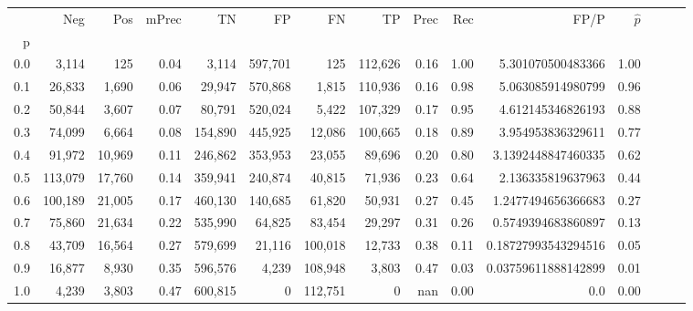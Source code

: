 \begin{tabular}{rrrrrrrrrrrrrrr}
\toprule
{} &      Neg &     Pos & mPrec &       TN &       FP &       FN &       TP &  Prec &   Rec &                 FP/P & $\hat{p}$ \\
p   &          &         &       &          &          &          &          &       &       &                      &           \\
\midrule
0.0 &    3,114 &     125 &  0.04 &    3,114 &  597,701 &      125 &  112,626 &  0.16 &  1.00 &    5.301070500483366 &      1.00 \\
0.1 &   26,833 &   1,690 &  0.06 &   29,947 &  570,868 &    1,815 &  110,936 &  0.16 &  0.98 &    5.063085914980799 &      0.96 \\
0.2 &   50,844 &   3,607 &  0.07 &   80,791 &  520,024 &    5,422 &  107,329 &  0.17 &  0.95 &    4.612145346826193 &      0.88 \\
0.3 &   74,099 &   6,664 &  0.08 &  154,890 &  445,925 &   12,086 &  100,665 &  0.18 &  0.89 &    3.954953836329611 &      0.77 \\
0.4 &   91,972 &  10,969 &  0.11 &  246,862 &  353,953 &   23,055 &   89,696 &  0.20 &  0.80 &   3.1392448847460335 &      0.62 \\
0.5 &  113,079 &  17,760 &  0.14 &  359,941 &  240,874 &   40,815 &   71,936 &  0.23 &  0.64 &    2.136335819637963 &      0.44 \\
0.6 &  100,189 &  21,005 &  0.17 &  460,130 &  140,685 &   61,820 &   50,931 &  0.27 &  0.45 &   1.2477494656366683 &      0.27 \\
0.7 &   75,860 &  21,634 &  0.22 &  535,990 &   64,825 &   83,454 &   29,297 &  0.31 &  0.26 &   0.5749394683860897 &      0.13 \\
0.8 &   43,709 &  16,564 &  0.27 &  579,699 &   21,116 &  100,018 &   12,733 &  0.38 &  0.11 &  0.18727993543294516 &      0.05 \\
0.9 &   16,877 &   8,930 &  0.35 &  596,576 &    4,239 &  108,948 &    3,803 &  0.47 &  0.03 &  0.03759611888142899 &      0.01 \\
1.0 &    4,239 &   3,803 &  0.47 &  600,815 &        0 &  112,751 &        0 &   nan &  0.00 &                  0.0 &      0.00 \\
\bottomrule
\end{tabular}
